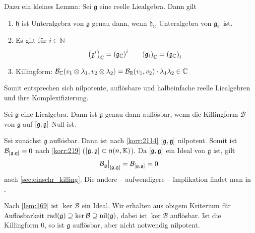 Dazu ein kleines Lemma: Sei $\mathfrak{g}$ eine reelle Liealgebra.
Dann gilt
\begin{enumerate}[1)]
	\item $\mathfrak{h}$ ist Unteralgebra von $\mathfrak{g}$ genau dann, wenn $\mathfrak{h}_\mathbb{C}$ Unteralgebra von $\mathfrak{g}_\mathbb{C}$ ist.
	\item Es gilt für $i \in \mathbb{N}$
	\[
		\enbrace*{\mathfrak{g}^i}_\mathbb{C} = \enbrace*{\mathfrak{g}_\mathbb{C}}^i \qquad \enbrace*{\mathfrak{g}_i}_\mathbb{C} = \enbrace*{\mathfrak{g}_\mathbb{C}}_i
	\]
	\item Killingform: $\mathcal{B}_\mathbb{C} \enbrace*{v_1 \otimes \lambda_1, v_2 \otimes \lambda_2} = \mathcal{B}_\mathbb{R}(v_1,v_2) \cdot \lambda_1 \lambda_2 \in \mathbb{C}$
\end{enumerate}
Somit entsprechen sich nilpotente, auflösbare und halbeinfache reelle Liealgebren und ihre Komplexifizierung.

\begin{satz}[name={Cartan},label=satz:2115]
	Sei $\mathfrak{g}$ eine Liealgebra.
	Dann ist $\mathfrak{g}$ genau dann auflösbar, wenn die Killingform $\mathcal{B}$ von $\mathfrak{g}$ auf $\benbrace*{\mathfrak{g},\mathfrak{g}}$ Null ist.
\end{satz}
\begin{beweis}
	Sei zunächst $\mathfrak{g}$ auflösbar.
	Dann ist nach \autoref{korr:2114} $\benbrace*{\mathfrak{g},\mathfrak{g}}$ nilpotent.
	Somit ist $\mathcal{B}_{\benbrace{\mathfrak{g},\mathfrak{g}}}=0$ nach \autoref{korr:219} ($\benbrace*{\mathfrak{g},\mathfrak{g}} \subset \mathfrak{n}(n,\mathbb{\mathbb{K}})$).
	Da $\benbrace*{\mathfrak{g},\mathfrak{g}}$ ein Ideal von $\mathfrak{g}$ ist, gilt 
	\[
		\mathcal{B}_{\mathfrak{g}}\big|_{\benbrace*{\mathfrak{g},\mathfrak{g}}} = \mathcal{B}_{\benbrace*{\mathfrak{g},\mathfrak{g}}} =0
	\]
	nach \cref{sec:einschr_killing}.
	Die andere -- aufwendigere -- Implikation findet man in \cite[Sec.~4.6.4]{procesiLie}.
\end{beweis}

Nach \autoref{lem:169} ist $\ker \mathcal{B}$ ein Ideal.
Wir erhalten aus obigem Kriterium für Auflösbarkeit $\rad(\mathfrak{g}) \supseteq \ker \mathcal{B} \supseteq \nil(\mathfrak{g})$, dabei ist $\ker \mathcal{B}$ auflösbar.
Ist die Killingform $0$, so ist $\mathfrak{g}$ auflösbar, aber nicht notwendig nilpotent.

